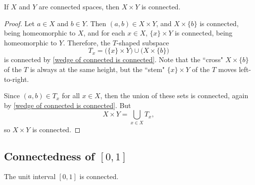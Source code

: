 \documentclass[noname]{notes}
\begin{document}
\begin{theorem}
	If $X$ and $Y$ are connected spaces, then $X \times Y$ is connected. 
\end{theorem}

\begin{proof}
	Let $a \in X$ and $b \in Y$. Then $(a,b) \in X \times Y$, and $X \times \{b\}$ is connected, being homeomorphic to $X$, and for each $x \in X$, $\{x\} \times Y$ is connected, being homeomorphic to $Y$. Therefore, the $T$-shaped subspace 
	\[
		T_x = \Big(\{x\} \times Y\Big) \cup \Big(X \times \{b\}\Big)
	\] 
	is connected by \cref{wedge of connected is connected}. Note that the ``cross" $X \times \{b\}$ of the $T$ is always at the same height, but the ``stem" $\{x\} \times Y$ of the $T$ moves left-to-right. 
	
	Since $(a,b) \in T_x$ for all $x \in X$, then the union of these sets is connected, again by \cref{wedge of connected is connected}. But 
	\[
		X \times Y = \bigcup_{x \in X} T_x,
	\]	
	so $X \times Y$ is connected. 
\end{proof}

\subsection{Connectedness of $[0,1]$}

\begin{theorem}
	The unit interval $[0,1]$ is connected. 
\end{theorem}
\end{document}
